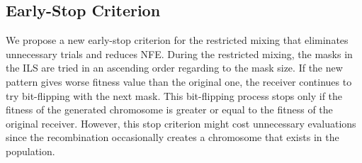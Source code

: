 \documentclass{sig-alternate-05-2015}
\begin{document}
\subsection{Early-Stop Criterion}

We propose a new early-stop criterion for the restricted mixing that eliminates unnecessary trials and reduces NFE. During the restricted mixing, the masks in the ILS are tried in an ascending order regarding to the mask size. If the new pattern gives worse fitness value than the original one, the receiver continues to try bit-flipping with the next  mask. This bit-flipping process stops only if the fitness of the generated chromosome is greater or equal to the fitness of the original receiver. However, this stop criterion might cost unnecessary evaluations since the recombination occasionally creates a chromosome that exists in the population. 
\end{document}
